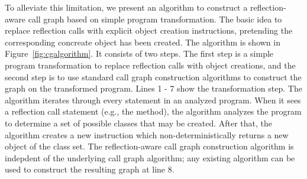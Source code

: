 

To alleviate this limitation, we present an algorithm to construct
a reflection-aware call graph based on simple program transformation.
The basic idea to replace reflection calls with explicit object
creation instructions, pretending the corresponding concreate object
has been created.  The algorithm is shown in Figure~\ref{fig:cgalgorithm}.
It consists of two steps. The first step is a simple program
transformation to replace reflection calls with object creations, and
the second step is to use standard call graph construction algorithms
to construct the graph on the transformed program. Lines 1 - 7 show
the transformation step. The algorithm iterates through every statement
in an analyzed program. When it sees a reflection call statement (e.g.,
the  method), the algorithm analyzes the
program to determine a set of possible classes that may be created.
After that, the algorithm creates a new instruction which non-deterministically
returns a new object of the class set. The reflection-aware call graph
construction algorithm is indepdent of the underlying call graph algorithm;
any existing algorithm can be used to construct the resulting graph at line 8.

